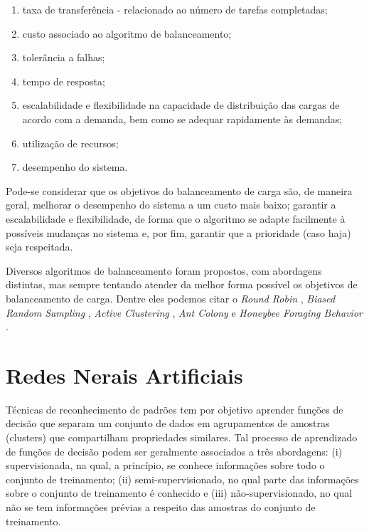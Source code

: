 \begin{enumerate}
	\item taxa de transferência - relacionado ao número de tarefas completadas; 
	\item custo associado ao algoritmo de balanceamento; 
	\item tolerância a falhas;
	\item tempo de resposta; 
	\item escalabilidade e flexibilidade na capacidade de distribuição das cargas de acordo com a demanda, bem como se adequar rapidamente às demandas; 
	\item utilização de recursos;
	\item desempenho do sistema. 	
\end{enumerate}


Pode-se considerar que os objetivos do balanceamento de carga são, de maneira geral, melhorar o desempenho do sistema a um custo mais baixo; garantir a escalabilidade e flexibilidade, de forma que o algoritmo se adapte facilmente à possíveis mudanças no sistema e, por fim, garantir que a prioridade (caso haja) seja respeitada\cite{kaur2012load}. 

Diversos algoritmos de balanceamento foram propostos, com abordagens distintas, mas sempre tentando atender da melhor forma possível os objetivos de balanceamento de carga. Dentre eles podemos citar o \textit{Round Robin} \cite{soni2014novel}, \textit{Biased Random Sampling} \cite{randles2010comparative}, \textit{Active Clustering} \cite{randles2010comparative}, \textit{Ant Colony}\cite{nishant2012load} e \textit{Honeybee Foraging Behavior} \cite{randles2010comparative}.  

\newpage
\section{Redes Nerais Artificiais}\label{sec:rna}

Técnicas de reconhecimento de padrões tem por objetivo aprender funções de decisão que separam um conjunto de dados em agrupamentos de amostras (clusters) que compartilham propriedades similares\cite{Duda:00}. Tal processo de aprendizado de funções de decisão podem ser geralmente associados a três abordagens: (i) supervisionada, na qual, a princípio, se conhece informações sobre todo o conjunto de treinamento; (ii) semi-supervisionado, no qual parte das informações sobre o conjunto de treinamento é conhecido e (iii) não-supervisionado, no qual não se tem informações prévias a respeito das amostras do conjunto de treinamento. 

